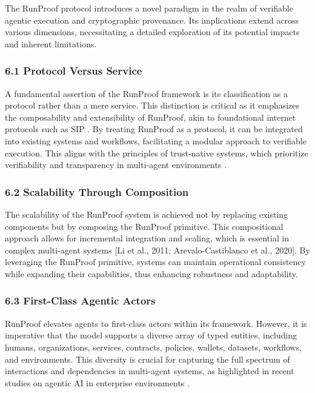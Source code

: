 \documentclass[11pt]{article}
\begin{document}
The RunProof protocol introduces a novel paradigm in the realm of verifiable agentic execution and cryptographic provenance. Its implications extend across various dimensions, necessitating a detailed exploration of its potential impacts and inherent limitations.

\subsubsection{6.1 Protocol Versus Service}

A fundamental assertion of the RunProof framework is its classification as a protocol rather than a mere service. This distinction is critical as it emphasizes the composability and extensibility of RunProof, akin to foundational internet protocols such as SIP \cite{Guezouri2010}. By treating RunProof as a protocol, it can be integrated into existing systems and workflows, facilitating a modular approach to verifiable execution. This aligns with the principles of trust-native systems, which prioritize verifiability and transparency in multi-agent environments \cite{Li2025}.

\subsubsection{6.2 Scalability Through Composition}

The scalability of the RunProof system is achieved not by replacing existing components but by composing the RunProof primitive. This compositional approach allows for incremental integration and scaling, which is essential in complex multi-agent systems [Li et al., 2011; Arevalo-Castiblanco et al., 2020]. By leveraging the RunProof primitive, systems can maintain operational consistency while expanding their capabilities, thus enhancing robustness and adaptability.

\subsubsection{6.3 First-Class Agentic Actors}

RunProof elevates agents to first-class actors within its framework. However, it is imperative that the model supports a diverse array of typed entities, including humans, organizations, services, contracts, policies, wallets, datasets, workflows, and environments. This diversity is crucial for capturing the full spectrum of interactions and dependencies in multi-agent systems, as highlighted in recent studies on agentic AI in enterprise environments \cite{Moslemi2026}.
\end{document}
